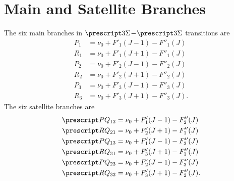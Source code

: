 \section{Main and Satellite Branches}

The six main branches in $\state{3}{\Sigma}\dash\state{3}{\Sigma}$ transitions are \cite[249]{herzbergMolecularSpectraMolecular1950}
\begin{align*}
    P_1 & = \nu_0 + F'_1(J - 1) - F''_1(J)  \\
    R_1 & = \nu_0 + F'_1(J + 1) - F''_1(J)  \\
    P_2 & = \nu_0 + F'_2(J - 1) - F''_2(J)  \\
    R_2 & = \nu_0 + F'_2(J + 1) - F''_2(J)  \\
    P_3 & = \nu_0 + F'_3(J - 1) - F''_3(J)  \\
    R_3 & = \nu_0 + F'_3(J + 1) - F''_3(J).
\end{align*}
The six satellite branches are
\begin{align*}
    \state{P}{Q}_{12} & = \nu_0 + F'_1(J - 1) - F''_2(J)  \\
    \state{R}{Q}_{21} & = \nu_0 + F'_2(J + 1) - F''_1(J)  \\
    \state{P}{Q}_{13} & = \nu_0 + F'_1(J - 1) - F''_3(J)  \\
    \state{R}{Q}_{31} & = \nu_0 + F'_3(J + 1) - F''_1(J)  \\
    \state{P}{Q}_{23} & = \nu_0 + F'_2(J - 1) - F''_3(J)  \\
    \state{R}{Q}_{32} & = \nu_0 + F'_3(J + 1) - F''_2(J).
\end{align*}
